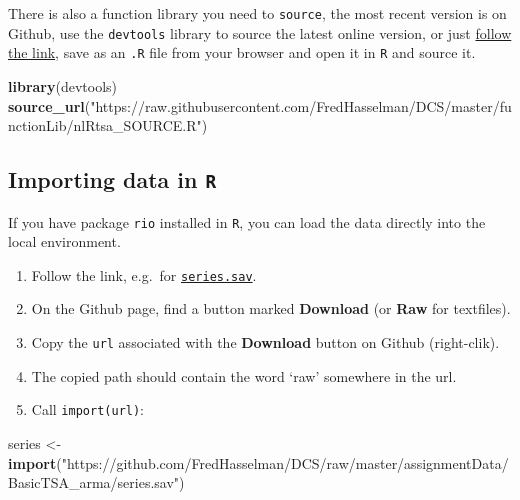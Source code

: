 \documentclass[]{book}
\newenvironment{Shaded}{\begin{snugshade}}{\end{snugshade}}
\newcommand{\KeywordTok}[1]{\textcolor[rgb]{0.13,0.29,0.53}{\textbf{{#1}}}}
\newcommand{\StringTok}[1]{\textcolor[rgb]{0.31,0.60,0.02}{{#1}}}
\newcommand{\NormalTok}[1]{{#1}}
\providecommand{\tightlist}{%
  \setlength{\itemsep}{0pt}\setlength{\parskip}{0pt}}
\begin{document}
There is also a function library you need to \texttt{source}, the most
recent version is on Github, use the \texttt{devtools} library to source
the latest online version, or just
\href{https://raw.githubusercontent.com/FredHasselman/DCS/master/functionLib/nlRtsa_SOURCE.R}{follow
the link}, save as an \texttt{.R} file from your browser and open it in
\texttt{R} and source it.

\begin{Shaded}
\begin{Highlighting}[]
\KeywordTok{library}\NormalTok{(devtools)}
\KeywordTok{source_url}\NormalTok{(}\StringTok{"https://raw.githubusercontent.com/FredHasselman/DCS/master/functionLib/nlRtsa_SOURCE.R"}\NormalTok{)}
\end{Highlighting}
\end{Shaded}

\subsection{\texorpdfstring{Importing data in
\texttt{R}}{Importing data in R}}\label{importing-data-in-r}

If you have package \texttt{rio} installed in \texttt{R}, you can load
the data directly into the local environment.

\begin{enumerate}
\def\labelenumi{\arabic{enumi}.}
\tightlist
\item
  Follow the link, e.g.~for
  \href{https://github.com/FredHasselman/DCS/blob/master/assignmentData/BasicTSA_arma/series.sav}{\texttt{series.sav}}.
\item
  On the Github page, find a button marked \textbf{Download} (or
  \textbf{Raw} for textfiles).
\item
  Copy the \texttt{url} associated with the \textbf{Download} button on
  Github (right-clik).
\item
  The copied path should contain the word `raw' somewhere in the url.
\item
  Call \texttt{import(url)}:
\end{enumerate}

\begin{Shaded}
\begin{Highlighting}[]
\NormalTok{series <-}\StringTok{ }\KeywordTok{import}\NormalTok{(}\StringTok{"https://github.com/FredHasselman/DCS/raw/master/assignmentData/BasicTSA_arma/series.sav"}\NormalTok{)}
\end{Highlighting}
\end{Shaded}
\end{document}
